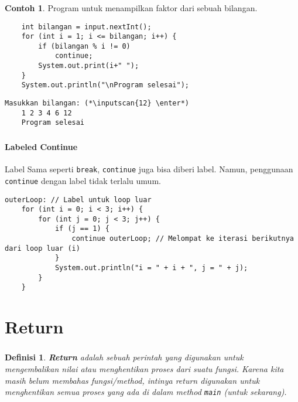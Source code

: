 \documentclass[aspectratio=169]{beamer}
\newtheorem*{definisi}{Definisi}
\theoremstyle{definition}
\newtheorem*{contoh}{Contoh}
\newcommand{\enter}{\raisebox{-1.8pt}{\begin{tikzpicture}[scale=0.3]
    \draw[thin,fill=gray] (0,0) rectangle (2,1);
    \draw (0.3,0.3) -- (0.7,0.3)--(0.7,0.6);     
\end{tikzpicture}}}
\newcommand{\inputscan}[1]{\raisebox{0pt}[1pt]{\colorbox{darkgray}{#1}}}
\begin{document}
    \begin{frame}[fragile]
        \frametitle{\insertsection}
        \begin{contoh}
            Program untuk menampilkan faktor dari sebuah bilangan.
        \end{contoh}
        \begin{lstlisting}
    int bilangan = input.nextInt();
    for (int i = 1; i <= bilangan; i++) {
        if (bilangan % i != 0)
            continue;
        System.out.print(i+" ");
    }
    System.out.println("\nProgram selesai");
        \end{lstlisting}
        \begin{lstlisting}[style=output]
    Masukkan bilangan: (*\inputscan{12} \enter*)
    1 2 3 4 6 12
    Program selesai
        \end{lstlisting}
    \end{frame}

    \begin{frame}[fragile]
        \frametitle{\insertsection}
        \framesubtitle{Labeled Continue}
        \begin{block}{Label}
            Sama seperti \texttt{break}, \texttt{continue} juga bisa diberi label. Namun, penggunaan \texttt{continue} dengan label tidak terlalu umum.
        \end{block}
        \begin{lstlisting}[style=standard,firstnumber=9,caption={Labeled Continue}]
    outerLoop: // Label untuk loop luar
    for (int i = 0; i < 3; i++) {
        for (int j = 0; j < 3; j++) {
            if (j == 1) {
                continue outerLoop; // Melompat ke iterasi berikutnya dari loop luar (i)
            }
            System.out.println("i = " + i + ", j = " + j);
        }
    }
        \end{lstlisting}
    \end{frame}

    \section{Return}
    \begin{frame}
        \frametitle{\insertsection}
        \begin{definisi}
            \textbf{Return} adalah sebuah perintah yang digunakan untuk mengembalikan nilai atau menghentikan proses dari suatu fungsi. Karena kita masih belum membahas fungsi/method, intinya return digunakan untuk menghentikan semua proses yang ada di dalam method \texttt{main} (untuk sekarang).
        \end{definisi}
    \end{frame}
\end{document}
